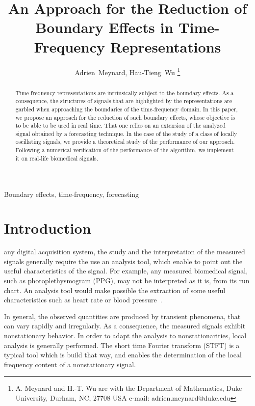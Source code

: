 \documentclass[journal]{IEEEtran}
\title{An Approach for the Reduction of Boundary Effects in Time-Frequency Representations}
\author{Adrien~Meynard, %
        Hau-Tieng~Wu
\thanks{A. Meynard and H.-T. Wu are with the Department
of Mathematics, Duke University, Durham,
NC, 27708 USA e-mail: adrien.meynard@duke.edu}}
\begin{document}
\maketitle

\begin{abstract}
Time-frequency representations are intrinsically subject to the boundary effects. As a consequence, the structures of signals that are highlighted by the representations are garbled when approaching the boundaries of the time-frequency domain. In this paper, we propose an approach for the reduction of such boundary effects, whose objective is to be able to be used in real time. That one relies on an extension of the analyzed signal obtained by a forecasting technique. In the case of the study of a class of locally oscillating signals, we provide a theoretical study of the performance of our approach. Following a numerical verification of the performance of the algorithm, we implement it on real-life biomedical signals.
\end{abstract}

\begin{IEEEkeywords}
Boundary effects, time-frequency, forecasting
\end{IEEEkeywords}

\section{Introduction}
 any digital acquisition system, the study and the interpretation of the measured signals generally require the use an analysis tool, which enable to point out the useful characteristics of the signal. For example, any  measured biomedical signal, such as photoplethysmogram (PPG), may not be interpreted as it is, from its run chart. An analysis tool would make possible the extraction of some useful characteristics such as heart rate or blood pressure~\cite{Akay96detection}. 

In general, the observed quantities are produced by transient phenomena, that can vary rapidly and irregularly. As a consequence, the measured signals exhibit nonstationary behavior. In order to adapt the analysis to nonstationarities, local analysis is generally performed. The short time Fourier transform (STFT) is a typical tool which is build that way, and enables the determination of the local frequency content of a nonstationary signal.
\end{document}
